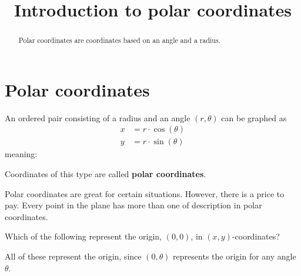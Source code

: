 \documentclass{ximera}
\title[Dig-In:]{Introduction to polar coordinates}
\begin{document}
\begin{abstract}
Polar coordinates are coordinates based on an angle and a radius.
\end{abstract}
\maketitle

\section{Polar coordinates}


\begin{definition}
  An ordered pair consisting of a radius and an angle $(r,\theta)$
  can be graphed as
  \begin{align*}
    x &= r\cdot \cos(\theta)\\
    y &= r\cdot \sin(\theta)
  \end{align*}
  meaning:
  \begin{image}[2in]
  \end{image}
  Coordinates of this type are called \textbf{polar coordinates}.
\end{definition}

Polar coordinates are great for certain situations. However, there is
a price to pay. Every point in the plane has more than one of
description in polar coordinates.

\begin{question}
  Which of the following represent the origin, $(0,0)$, in
  $(x,y)$-coordinates?
  \begin{selectAll}
  \end{selectAll}
  \begin{feedback}
    All of these represent the origin, since $(0,\theta)$ represents
    the origin for any angle $\theta$.
  \end{feedback}
\end{question}
\end{document}

